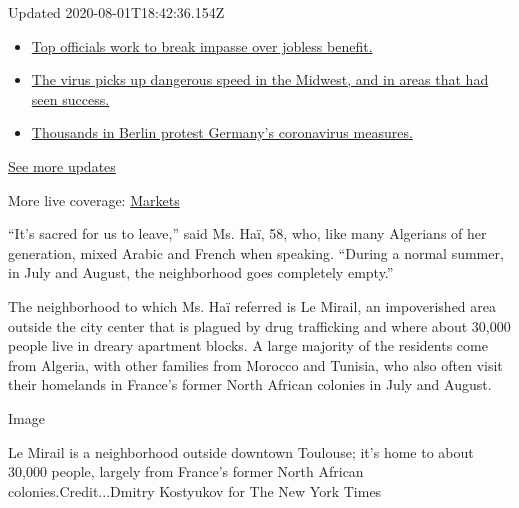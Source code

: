 Updated 2020-08-01T18:42:36.154Z

\begin{itemize}
\tightlist
\item
  \href{https://www.nytimes.com/2020/08/01/world/coronavirus-covid-19.html?action=click\&pgtype=Article\&state=default\&region=MAIN_CONTENT_1\&context=storylines_live_updates\#link-3ac56579}{Top
  officials work to break impasse over jobless benefit.}
\item
  \href{https://www.nytimes.com/2020/08/01/world/coronavirus-covid-19.html?action=click\&pgtype=Article\&state=default\&region=MAIN_CONTENT_1\&context=storylines_live_updates\#link-8796723}{The
  virus picks up dangerous speed in the Midwest, and in areas that had
  seen success.}
\item
  \href{https://www.nytimes.com/2020/08/01/world/coronavirus-covid-19.html?action=click\&pgtype=Article\&state=default\&region=MAIN_CONTENT_1\&context=storylines_live_updates\#link-25930521}{Thousands
  in Berlin protest Germany's coronavirus measures.}
\end{itemize}

\href{https://www.nytimes.com/2020/08/01/world/coronavirus-covid-19.html?action=click\&pgtype=Article\&state=default\&region=MAIN_CONTENT_1\&context=storylines_live_updates}{See
more updates}

More live coverage:
\href{https://www.nytimes.com/live/2020/07/31/business/stock-market-today-coronavirus?action=click\&pgtype=Article\&state=default\&region=MAIN_CONTENT_1\&context=storylines_live_updates}{Markets}

``It's sacred for us to leave,'' said Ms. Haï, 58, who, like many
Algerians of her generation, mixed Arabic and French when speaking.
``During a normal summer, in July and August, the neighborhood goes
completely empty.''

The neighborhood to which Ms. Haï referred is Le Mirail, an impoverished
area outside the city center that is plagued by drug trafficking and
where about 30,000 people live in dreary apartment blocks. A large
majority of the residents come from Algeria, with other families from
Morocco and Tunisia, who also often visit their homelands in France's
former North African colonies in July and August.

Image

Le Mirail is a neighborhood outside downtown Toulouse; it's home to
about 30,000 people, largely from France's former North African
colonies.Credit...Dmitry Kostyukov for The New York Times


